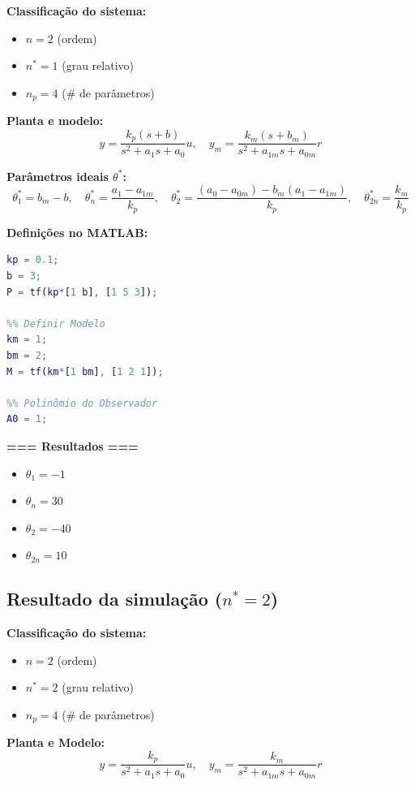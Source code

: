 \documentclass[10pt]{article}
\begin{document}
\textbf{Classificação do sistema:}

\begin{itemize}
    \item $n = 2$ (ordem)
    \item $n^* = 1$ (grau relativo)
    \item $n_p = 4$ (\# de parâmetros)
\end{itemize}

\textbf{Planta e modelo:}
\[
    y = \frac{k_p(s + b)}{s^2 + a_1 s + a_0} u, \quad y_m = \frac{k_m(s + b_m)}{s^2 + a_{1m} s + a_{0m}} r
\]

\textbf{Parâmetros ideais $\theta^*$:}
\[
    \theta_1^* = b_m - b, \quad
    \theta_n^* = \frac{a_1 - a_{1m}}{k_p}, \quad
    \theta_2^* = \frac{(a_0 - a_{0m}) - b_m(a_1 - a_{1m})}{k_p}, \quad
    \theta_{2n}^* = \frac{k_m}{k_p}
\]

\textbf{Definições no MATLAB:}
\begin{lstlisting}[language=Matlab]
%% Definir Planta
kp = 0.1;
b = 3;
P = tf(kp*[1 b], [1 5 3]);

%% Definir Modelo
km = 1;
bm = 2;
M = tf(km*[1 bm], [1 2 1]);

%% Polinômio do Observador
A0 = 1;
\end{lstlisting}

\textbf{=== Resultados ===}
\begin{itemize}
    \item $\theta_1 = -1$
    \item $\theta_n = 30$
    \item $\theta_2 = -40$
    \item $\theta_{2n} = 10$
\end{itemize}

\newpage

\subsection{Resultado da simulação (\texorpdfstring{$n^* = 2$}{n*=2})}

\textbf{Classificação do sistema:}

\begin{itemize}
    \item $n = 2$ (ordem)
    \item $n^* = 2$ (grau relativo)
    \item $n_p = 4$ (\# de parâmetros)
\end{itemize}

\textbf{Planta e Modelo:}
\[
    y = \frac{k_p}{s^2 + a_1 s + a_0} u, \quad y_m = \frac{k_m}{s^2 + a_{1m} s + a_{0m}} r
\]
\end{document}
